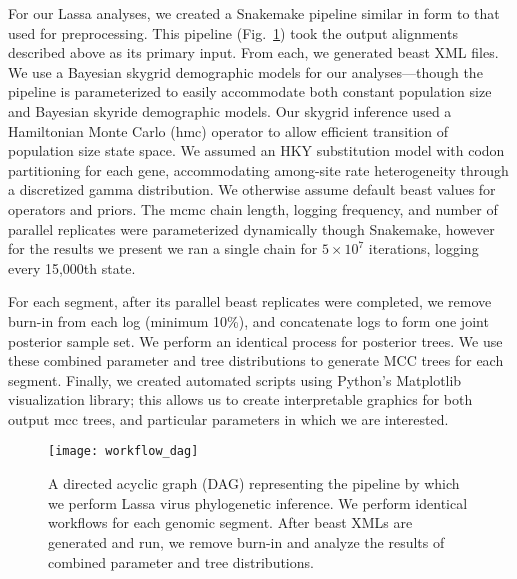 For our Lassa analyses, we created a Snakemake pipeline similar in form to that used for preprocessing.
This pipeline (Fig.~\ref{fig:workflow_dag}) took the output alignments described above as its primary input.
From each, we generated \gls{beast} XML files.
We use a Bayesian skygrid demographic models for our analyses---though the pipeline is parameterized to easily accommodate both constant population size and Bayesian skyride\cite{minin2008smooth} demographic models.
Our skygrid inference used a Hamiltonian Monte Carlo (\gls{hmc}) operator to allow efficient transition of population size state space\cite{baele2020hamiltonian}.
We assumed an HKY substitution model with codon partitioning for each gene, accommodating among-site rate heterogeneity through a discretized gamma distribution.
We otherwise assume default \gls{beast} values for operators and priors.
The \gls{mcmc} chain length, logging frequency, and number of parallel replicates were parameterized dynamically though Snakemake, however for the results we present we ran a single chain for $5\times10^7$ iterations, logging every 15,000th state.

For each segment, after its parallel \gls{beast} replicates were completed, we remove burn-in from each log (minimum 10\%), and concatenate logs to form one joint posterior sample set.
We perform an identical process for posterior trees.
We use these combined parameter and tree distributions to generate MCC trees for each segment.
Finally, we created automated scripts using Python's Matplotlib\cite{hunter2007matplotlib} visualization library; this allows us to create interpretable graphics for both output \gls{mcc} trees, and particular parameters in which we are interested.

\begin{figure}[ht]
  \centering
  \medskip
  \texttt{[image: workflow\_dag]}
  \caption[Lassa phylogenetics pipeline]{A directed acyclic graph (DAG) representing the pipeline by which we perform Lassa virus phylogenetic inference. We perform identical workflows for each genomic segment. After \gls{beast} XMLs are generated and run, we remove burn-in and analyze the results of combined parameter and tree distributions.}
  \label{fig:workflow_dag}
\end{figure}

